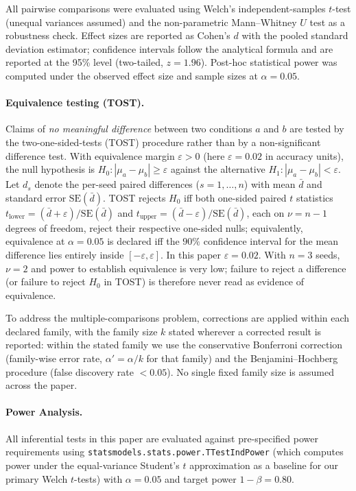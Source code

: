 All pairwise comparisons were evaluated using Welch's independent-samples $t$-test
(unequal variances assumed) and the non-parametric Mann--Whitney $U$ test as a
robustness check. Effect sizes are reported as Cohen's $d$ with the pooled
standard deviation estimator; confidence intervals follow the
\citet{hedges1985statistical} analytical formula and are reported at the 95\% level
(two-tailed, $z = 1.96$). Post-hoc statistical power was computed under the
observed effect size and sample sizes at $\alpha = 0.05$.

\paragraph{Equivalence testing (TOST).}
Claims of \emph{no meaningful difference} between two conditions $a$ and $b$ are tested by the two-one-sided-tests (TOST) procedure rather than by a non-significant difference test.
With equivalence margin $\varepsilon > 0$ (here $\varepsilon = 0.02$ in accuracy units), the null hypothesis is $H_0\colon |\mu_a - \mu_b| \ge \varepsilon$ against the alternative $H_1\colon |\mu_a - \mu_b| < \varepsilon$.
Let $d_s$ denote the per-seed paired differences ($s = 1,\ldots,n$) with mean $\bar{d}$ and standard error $\mathrm{SE}(\bar{d})$.
TOST rejects $H_0$ iff both one-sided paired $t$ statistics $t_{\mathrm{lower}} = (\bar{d} + \varepsilon)/\mathrm{SE}(\bar{d})$ and $t_{\mathrm{upper}} = (\bar{d} - \varepsilon)/\mathrm{SE}(\bar{d})$, each on $\nu = n - 1$ degrees of freedom, reject their respective one-sided nulls; equivalently, equivalence at $\alpha = 0.05$ is declared iff the $90\%$ confidence interval for the mean difference lies entirely inside $[-\varepsilon, \varepsilon]$.
In this paper $\varepsilon = 0.02$.
With $n = 3$ seeds, $\nu = 2$ and power to establish equivalence is very low; failure to reject a difference (or failure to reject $H_0$ in TOST) is therefore never read as evidence of equivalence.

To address the multiple-comparisons problem, corrections are applied within each declared family, with the family size $k$ stated wherever a corrected result is reported: within the stated family we use the conservative Bonferroni correction (family-wise error rate, $\alpha' = \alpha / k$ for that family) and the Benjamini--Hochberg procedure (false discovery rate $< 0.05$).
No single fixed family size is assumed across the paper.

\paragraph{Power Analysis.}
All inferential tests in this paper are evaluated against pre-specified power
requirements using \texttt{statsmodels.stats.power.TTestIndPower} (which computes power under the equal-variance Student's $t$ approximation as a baseline for our primary Welch $t$-tests) with
$\alpha = 0.05$ and target power $1 - \beta = 0.80$.

